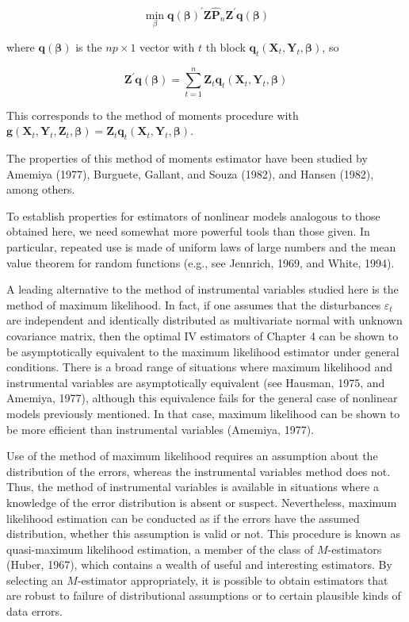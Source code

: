 \documentclass[10pt]{article}
\begin{document}
$$
\min _{\beta} \mathbf{q}(\boldsymbol{\beta})^{\prime} \mathbf{Z} \hat{\mathbf{P}}_{n} \mathbf{Z}^{\prime} \mathbf{q}(\boldsymbol{\beta})
$$

where $\mathbf{q}(\boldsymbol{\beta})$ is the $n p \times 1$ vector with $t$ th block $\mathbf{q}_{t}\left(\mathbf{X}_{t}, \mathbf{Y}_{t}, \boldsymbol{\beta}\right)$, so

$$
\mathbf{Z}^{\prime} \mathbf{q}(\boldsymbol{\beta})=\sum_{t=1}^{n} \mathbf{Z}_{t} \mathbf{q}_{t}\left(\mathbf{X}_{t}, \mathbf{Y}_{t}, \boldsymbol{\beta}\right)
$$

This corresponds to the method of moments procedure with $\mathbf{g}\left(\mathbf{X}_{t}, \mathbf{Y}_{t}, \mathbf{Z}_{t}, \boldsymbol{\beta}\right) =\mathbf{Z}_{t} \mathbf{q}_{t}\left(\mathbf{X}_{t}, \mathbf{Y}_{t}, \boldsymbol{\beta}\right)$.

The properties of this method of moments estimator have been studied by Amemiya (1977), Burguete, Gallant, and Souza (1982), and Hansen (1982), among others.

To establish properties for estimators of nonlinear models analogous to those obtained here, we need somewhat more powerful tools than those given. In particular, repeated use is made of uniform laws of large numbers and the mean value theorem for random functions (e.g., see Jennrich, 1969, and White, 1994).

A leading alternative to the method of instrumental variables studied here is the method of maximum likelihood. In fact, if one assumes that the disturbances $\varepsilon_{t}$ are independent and identically distributed as multivariate normal with unknown covariance matrix, then the optimal IV estimators of Chapter 4 can be shown to be asymptotically equivalent to the maximum likelihood estimator under general conditions. There is a broad range of situations where maximum likelihood and instrumental variables are asymptotically equivalent (see Hausman, 1975, and Amemiya, 1977), although this equivalence fails for the general case of nonlinear models previously mentioned. In that case, maximum likelihood can be shown to be more efficient than instrumental variables (Amemiya, 1977).

Use of the method of maximum likelihood requires an assumption about the distribution of the errors, whereas the instrumental variables method does not. Thus, the method of instrumental variables is available in situations where a knowledge of the error distribution is absent or suspect. Nevertheless, maximum likelihood estimation can be conducted as if the errors have the assumed distribution, whether this assumption is valid or not. This procedure is known as quasi-maximum likelihood estimation, a member of the class of $M$-estimators (Huber, 1967), which contains a wealth of useful and interesting estimators. By selecting an $M$-estimator appropriately, it is possible to obtain estimators that are robust to failure of distributional assumptions or to certain plausible kinds of data errors.
\end{document}
